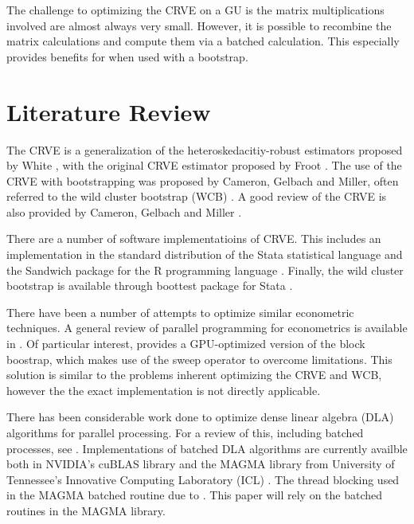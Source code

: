 \documentclass[11pt]{article}       %
\begin{document}
The challenge to optimizing the CRVE on a GU is the matrix multiplications involved are almost always very small. However, it is possible to recombine the matrix calculations and compute them via a batched calculation. This especially provides benefits for when used with a bootstrap.

\section{Literature Review} \label{litrev}

The CRVE is a generalization of the heteroskedacitiy-robust estimators proposed by White \cite{white1980hc}, with the original CRVE estimator proposed by Froot \cite{froot1989consistent}. The use of the CRVE with bootstrapping was proposed by Cameron, Gelbach and Miller, often referred to the wild cluster bootstrap (WCB) \cite{cameron2008bootstrap}. A good review of the CRVE is also provided by Cameron, Gelbach and Miller \cite{cameron2010robust}.

There are a number of software implementatioins of CRVE. This includes an implementation in the standard distribution of the Stata statistical language \cite{rogers1994regression} and the Sandwich package for the R programming language \cite{zeileis2004sandwitch}. Finally, the wild cluster bootstrap is available through boottest package for Stata \cite{roodman2015boottest}.

There have been a number of attempts to optimize similar econometric techniques. A general review of parallel programming for econometrics is available in \cite{guo2012econgpu}. Of particular interest, \cite{lopez2016gpu} provides a GPU-optimized version of the block boostrap, which makes use of the sweep operator to overcome limitations. This solution is similar to the problems inherent optimizing the CRVE and WCB, however the the exact implementation is not directly applicable.

There has been considerable work done to optimize dense linear algebra (DLA) algorithms for parallel processing. For a review of this, including batched processes, see \cite{dongarra2016parallel}. Implementations of batched DLA algorithms are currently availble both in NVIDIA's cuBLAS library \cite{nvidia2013basic} and the MAGMA library from University of Tennessee's Innovative Computing Laboratory (ICL) \cite{agullo2009numerical}. The thread blocking used in the MAGMA batched routine due to \cite{nath2010improved}. This paper will rely on the batched routines in the MAGMA library.
\end{document}
